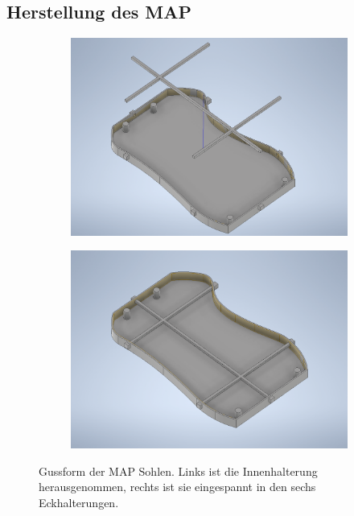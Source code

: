 \subsection{Herstellung des MAP} \FloatBarrier
\begin{figure}[tb]
	\hfill
	\begin{subfigure}[c]{.49\linewidth}
		\centering
		\includegraphics[width=\linewidth]{Bilder/Gussform_Innenteil_verschoben.png}
	\end{subfigure}
	\begin{subfigure}[c]{.49\linewidth}
		\centering
		\includegraphics[width=\linewidth]{Bilder/Gussform.png}		
	\end{subfigure}
	\hfill
	\caption{Gussform der MAP Sohlen. Links ist die Innenhalterung herausgenommen, rechts ist sie eingespannt in den sechs Eckhalterungen.}
	\label{Gussform_Inventor}
\end{figure}
